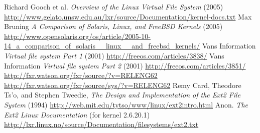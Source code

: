 \documentclass{book}
\begin{document}
\begin{thebibliography}{10}
 Richard Gooch et al. \textit{Overview of the Linux Virtual File System} (2005) \url{http://www.gelato.unsw.edu.au/lxr/source/Documentation/kernel-docs.txt} 
 Max Bruning \textit{A Comparison of Solaris, Linux, and FreeBSD Kernels} (2005) \url{http://www.opensolaris.org/os/article/2005-10-14_a_comparison_of_solaris__linux__and_freebsd_kernels/}
 Vans Information \textit{Virtual file system Part 1} (2001) \url{http://freeos.com/articles/3838/}
 Vans Information \textit{Virtual file system Part 2} (2001) \url{http://freeos.com/articles/3851/}
 \url{http://fxr.watson.org/fxr/source/?v=RELENG62}
 \url{http://fxr.watson.org/fxr/source/sys/?v=RELENG62}
 Remy Card, Theodore Ts'o, and Stephen Tweedie, \textit{The Design and Implementation of the Ext2 File System} (1994) \url{http://web.mit.edu/tytso/www/linux/ext2intro.html}
 Anon. \textit{The Ext2 Linux Documentation} (for kernel 2.6.20.1)  \url{http://lxr.linux.no/source/Documentation/filesystems/ext2.txt}

\end{thebibliography}
\end{document}
